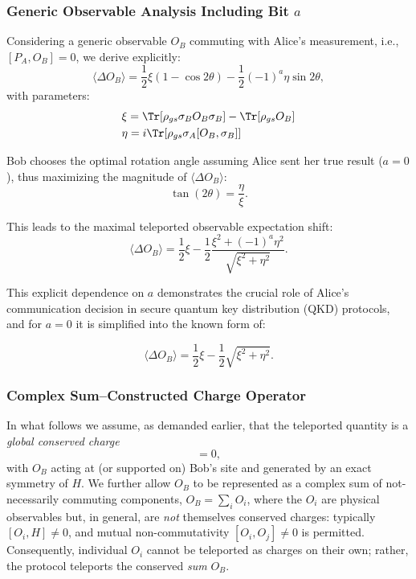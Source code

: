 \subsubsection{Generic Observable Analysis Including Bit \texorpdfstring{$a$}{a}}

Considering a generic observable $O_B$ commuting with Alice’s measurement, i.e., $[P_A,O_B]=0$, we derive explicitly:
\begin{equation}
\label{eq:deltaO-general}
\langle\Delta O_B\rangle=\frac{1}{2}\xi(1-\cos 2\theta)-\frac{1}{2}(-1)^a\eta\sin 2\theta,
\end{equation}
with parameters:
\begin{align}
&{}\xi=\Tr[\rho_{gs}\sigma_B O_B \sigma_B]-\Tr[\rho_{gs}O_B] \nonumber\\
&\eta=i\Tr[\rho_{gs}\sigma_A[O_B,\sigma_B]]
\end{align}

Bob chooses the optimal rotation angle assuming Alice sent her true result ($a=0$), thus maximizing the magnitude of $\langle\Delta O_B\rangle$:
\begin{equation}
\tan(2\theta)=\frac{\eta}{\xi}.
\end{equation}

This leads to the maximal teleported observable expectation shift:
\begin{equation}
\langle\Delta O_B\rangle=\frac{1}{2}\xi-\frac{1}{2}\frac{\xi^2+(-1)^a\eta^2}{\sqrt{\xi^2+\eta^2}}.
\end{equation}

This explicit dependence on $a$ demonstrates the crucial role of Alice's communication decision in secure quantum key distribution (QKD) protocols, and for $a=0$ it is simplified into the known form of:

\begin{equation*}
\langle\Delta O_B\rangle=\frac{1}{2}\xi-\frac{1}{2}\sqrt{\xi^2+\eta^2}.
\end{equation*}

\subsubsection{Complex Sum–Constructed Charge Operator}
\label{sec:complex-sum-constructed-operator}

In what follows we assume, as demanded earlier, that the teleported quantity is a \emph{global conserved charge}
\begin{equation}
[O_B,H]=0,
\end{equation}
with $O_B$ acting at (or supported on) Bob’s site and generated by an exact symmetry of $H$. We further allow $O_B$ to be represented as a complex sum of not-necessarily commuting components, $O_B=\sum_i O_i$, where the $O_i$ are physical observables but, in general, are \emph{not} themselves conserved charges: typically $[O_i,H]\neq 0$, and mutual non-commutativity $[O_i,O_j]\neq 0$ is permitted. Consequently, individual $O_i$ cannot be teleported as charges on their own; rather, the protocol teleports the conserved \emph{sum} $O_B$.

